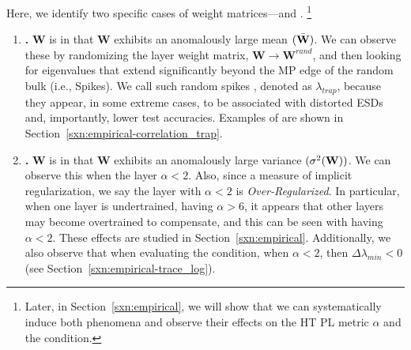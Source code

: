 Here, we identify two specific cases of \ATypical weight matrices---\CorrelationTraps and \emph{\OverRegularization}.%
\footnote{Later, in Section~\ref{sxn:empirical}, we will show that we can systematically induce both phenomena and observe their effects on the \HTSR HT PL metric $\alpha$ and the \SETOL \TRACELOG condition.}
\begin{enumerate}[label=3.3.\arabic*]
  \item 
  \textbf{\CorrelationTraps.} 
  $\mathbf{W}$ is \ATypical in that $\mathbf{W}$
 exhibits an anomalously large mean $(\bar{{\mathbf{W}}})$.  
  We can observe these by randomizing the layer weight matrix, $\mathbf{W}\rightarrow\mathbf{W}^{rand}$, and then looking
  for eigenvalues that extend significantly beyond the MP edge of the random bulk (i.e., Spikes).  We call such random spikes
  \emph{\CorrelationTraps},  denoted as $\lambda_{trap}$, because they appear, in some extreme cases, to be associated with distorted ESDs
  and, importantly, lower test accuracies.  Examples of \CorrelationTraps are shown in Section~\ref{sxn:empirical-correlation_trap}.
  \item 
  \textbf{\OverRegularization.} 
  $\mathbf{W}$ is \ATypical in that $\mathbf{W}$ exhibits an anomalously large variance $(\sigma^2({\mathbf{W}}))$. 
  We can observe this when the layer  $\alpha < 2$.  Also, since \ALPHA a measure of implicit regularization, we say the layer with $\alpha<2$ is \emph{Over-Regularized}.
  In particular, when one layer is undertrained, having $\alpha>6$, it appears that other layers may become overtrained to compensate, and this can be seen with having $\alpha < 2$.
  These effects are studied in Section~\ref{sxn:empirical}.
  Additionally, we also observe that when evaluating the \SETOL \TRACELOG condition, when $\alpha < 2$, then $\Delta \lambda_{min}< 0$ (see Section~\ref{sxn:empirical-trace_log}).

\end{enumerate}









